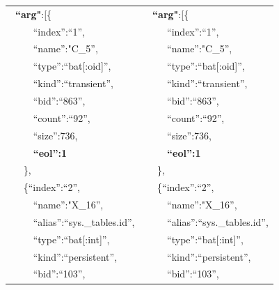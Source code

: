\documentclass[conference]{IEEEtran}
\begin{document}
\begin{figure}[t]
{\begin{tabular}{|l@{~}l|}
 ~\textbf{``arg"}:[\{                                     &   ~ \textbf{``arg"}:[\{                                      \\
 ~~~~   ``index'':``1'',                                  &   ~~~~    ``index'':``1'',                                   \\
 ~~~~   ``name'':"C\_5'',                                 &   ~~~~    ``name'':"C\_5'',                                  \\
 ~~~~   ``type'':``bat[:oid]'',                           &   ~~~~    ``type'':``bat[:oid]'',                            \\
 ~~~~   ``kind'':``transient'',                           &   ~~~~    ``kind'':``transient'',                            \\
 ~~~~   ``bid'':``863'',                                  &   ~~~~    ``bid'':``863'',                                   \\
 ~~~~   ``count'':``92'',                                 &   ~~~~    ``count'':``92'',                                  \\
 ~~~~   ``size'':736,                                     &   ~~~~    ``size'':736,                                      \\
 ~~~~   \textbf{``eol'':1}                                &   ~~~~    \textbf{``eol'':1}                                 \\
 ~~  \},                                                  &   ~~   \},                                                   \\
 ~~  \{``index'':``2'',                                   &   ~~   \{``index'':``2'',                                    \\
 ~~~~   ``name'':"X\_16'',                                &   ~~~~    ``name'':"X\_16'',                                 \\
 ~~~~   ``alias'':``sys.\_tables.id'',                    &   ~~~~    ``alias'':``sys.\_tables.id'',                     \\
 ~~~~   ``type'':``bat[:int]'',                           &   ~~~~    ``type'':``bat[:int]'',                            \\
 ~~~~   ``kind'':``persistent'',                          &   ~~~~    ``kind'':``persistent'',                           \\
 ~~~~   ``bid'':``103'',                                  &   ~~~~    ``bid'':``103'',                                   \\

\end{tabular}}
\end{figure}
\end{document}

